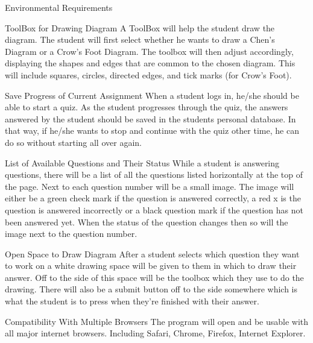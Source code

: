 \documentclass{article}
\begin{document}
\begin{section}{Environmental Requirements}

    \begin{subsection}{ToolBox for Drawing Diagram}
    A ToolBox will help the student draw the diagram. The student will first select whether he wants to draw a Chen’s Diagram or a Crow’s Foot Diagram. The toolbox will then adjust accordingly, displaying the shapes and edges that are common to the chosen diagram. This will include squares, circles, directed edges, and tick marks (for Crow’s Foot).
    
    \end{subsection}
    
    \begin{subsection}{Save Progress of Current Assignment}
    When a student logs in, he/she should be able to start a quiz. As the student progresses through the quiz, the answers answered by the student should be saved in the students personal database. In that way, if he/she wants to stop and continue with the quiz other time, he can do so without starting all over again.
    \end{subsection}
    
    \begin{subsection}{List of Available Questions and Their Status}
    While a student is answering questions, there will be a list of all the questions listed horizontally at the top of the page.  Next to each question number will be a small image.  The image will either be a green check mark if the question is answered correctly, a red x is the question is answered incorrectly or a black question mark if the question has not been answered yet.  When the status of the question changes then so will the image next to the question number.
    \end{subsection}
    
    \begin{subsection}{Open Space to Draw Diagram}
    After a student selects which question they want to work on a white drawing space will be given to them in which to draw their answer. Off to the side of this space will be the toolbox which they use to do the drawing. There will also be a submit button off to the side somewhere which is what the student is to press when they're finished with their answer.
    \end{subsection}
    
    \begin{subsection}{Compatibility With Multiple Browsers}
    The program will open and be usable with all major internet browsers. Including Safari, Chrome, Firefox, Internet Explorer.
    \end{subsection}

\end{section}
\end{document}
